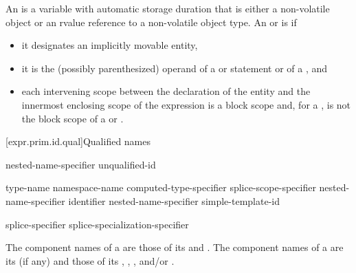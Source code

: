 \pnum
An  is
a variable with automatic storage duration
that is either a non-volatile object or
an rvalue reference to a non-volatile object type.
An  or
is  if
\begin{itemize}
\item
it designates an implicitly movable entity,
\item
it is the (possibly parenthesized)
operand of a  or
 statement or
of a , and
\item
each intervening scope between
the declaration of the entity and
the innermost enclosing scope of the expression
is a block scope and,
for a ,
is not the block scope of
a  or .
\end{itemize}

[expr.prim.id.qual]{Qualified names}

%
%
%
\begin{bnf}
\br
    nested-name-specifier  unqualified-id
\end{bnf}

%
%
%
\begin{bnf}
\br
    \terminal{::}\br
    type-name \terminal{::}\br
    namespace-name \terminal{::}\br
    computed-type-specifier \terminal{::}\br
    splice-scope-specifier \terminal{::}\br
    nested-name-specifier identifier \terminal{::}\br
    nested-name-specifier  simple-template-id \terminal{::}
\end{bnf}
\begin{bnf}
\br
    splice-specifier\br
     splice-specialization-specifier
\end{bnf}

\pnum
{}%
The component names of a  are those of
its  and .
The component names of a  are
its  (if any) and those of its
,
,
, and/or
.

